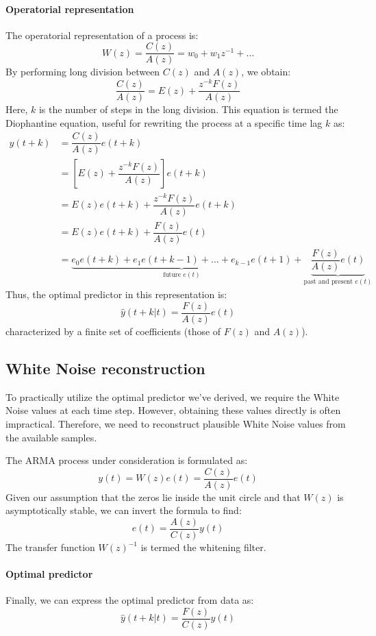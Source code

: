 \paragraph*{Operatorial representation}
The operatorial representation of a process is:
\[W(z)=\dfrac{C(z)}{A(z)}=w_0+w_1z^{-1}+\dots\]
By performing long division between $C(z)$ and $A(z)$, we obtain:
\[\dfrac{C(z)}{A(z)}=E(z)+\dfrac{z^{-k}F(z)}{A(z)}\]
Here, $k$ is the number of steps in the long division.
This equation is termed the Diophantine equation, useful for rewriting the process at a specific time lag $k$ as:
\begin{align*}
    y(t+k)  &=\dfrac{C(z)}{A(z)}e(t+k) \\
            &=\left[E(z)+\dfrac{z^{-k}F(z)}{A(z)}\right]e(t+k) \\
            &=E(z)e(t+k)+\dfrac{z^{-k}F(z)}{A(z)}e(t+k) \\
            &=E(z)e(t+k)+\dfrac{F(z)}{A(z)}e(t) \\
            &=\underbrace{e_0e(t+k)+e_1e(t+k-1)+...+e_{k-1}e(t+1)}_{\text{future } e(t)} +\underbrace{\dfrac{F(z)}{A(z)}e(t)}_{\text{past and present } e(t)} 
\end{align*}
Thus, the optimal predictor in this representation is:
\[\hat{y}(t+k|t)=\dfrac{F(z)}{A(z)}e(t)\]
characterized by a finite set of coefficients (those of $F(z)$ and $A(z)$).

\subsection{White Noise reconstruction}
To practically utilize the optimal predictor we've derived, we require the White Noise values at each time step. However, obtaining these values directly is often impractical. 
Therefore, we need to reconstruct plausible White Noise values from the available samples.

The ARMA process under consideration is formulated as:
\[y(t)=W(z)e(t)=\dfrac{C(z)}{A(z)}e(t)\]
Given our assumption that the zeros lie inside the unit circle and that $W(z)$ is asymptotically stable, we can invert the formula to find:
\[e(t)=\dfrac{A(z)}{C(z)}y(t)\]
The transfer function $W(z)^{-1}$ is termed the whitening filter.

\paragraph*{Optimal predictor}
Finally, we can express the optimal predictor from data as:
\[\hat{y}(t+k|t)=\dfrac{F(z)}{C(z)}y(t)\]

